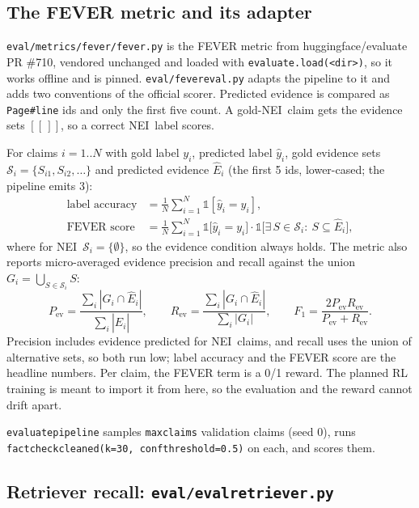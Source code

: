 \documentclass[11pt,a4paper]{article}
\makeatletter
\DeclareRobustCommand{\_}{\ifmmode\nfss@text{\textunderscore}\else\textunderscore\allowbreak\fi}
\newcommand{\file}[1]{\texttt{#1}}
\newcommand{\NEI}{\textup{NEI}}
\makeatother
\begin{document}
\subsection{The FEVER metric and its adapter}

\file{eval/metrics/fever/fever.py} is the FEVER metric from huggingface/evaluate PR \#710, vendored unchanged and
loaded with \texttt{evaluate.load(<dir>)}, so it works offline and is pinned. \file{eval/fever\_eval.py} adapts the
pipeline to it and adds two conventions of the official scorer. Predicted evidence is compared as
\texttt{Page\#line} ids and only the first five count. A gold-\NEI\ claim gets the evidence sets $[[\,]]$, so a correct
\NEI\ label scores.

For claims $i=1..N$ with gold label $y_i$, predicted label $\hat y_i$, gold evidence sets
$\mathcal{S}_i=\{S_{i1},S_{i2},\ldots\}$ and predicted evidence $\hat E_i$ (the first 5 ids, lower-cased; the
pipeline emits 3):
\begin{align*}
  \text{label accuracy} &= \frac1N\sum_{i=1}^N \mathbb{1}[\hat y_i = y_i],\\
  \text{FEVER score} &= \frac1N\sum_{i=1}^N \mathbb{1}\big[\hat y_i = y_i\big]\cdot
                         \mathbb{1}\big[\exists\,S\in\mathcal{S}_i:\ S\subseteq \hat E_i\big],
\end{align*}
where for \NEI\ $\mathcal{S}_i=\{\emptyset\}$, so the evidence condition always holds. The metric also reports
micro-averaged evidence precision and recall against the union $G_i=\bigcup_{S\in\mathcal{S}_i}S$:
\[
  P_\text{ev}=\frac{\sum_i|G_i\cap\hat E_i|}{\sum_i|\hat E_i|},\qquad
  R_\text{ev}=\frac{\sum_i|G_i\cap\hat E_i|}{\sum_i|G_i|},\qquad
  F_1=\frac{2P_\text{ev}R_\text{ev}}{P_\text{ev}+R_\text{ev}} .
\]
Precision includes evidence predicted for \NEI\ claims, and recall uses the union of alternative sets, so both run
low; label accuracy and the FEVER score are the headline numbers. Per claim, the FEVER term is a 0/1 reward. The
planned RL training is meant to import it from here, so the evaluation and the reward cannot drift apart.

\texttt{evaluate\_pipeline} samples \texttt{max\_claims} validation claims (seed 0), runs
\texttt{fact\_check\_cleaned(k=30, conf\_threshold=0.5)} on each, and scores them.

\subsection{Retriever recall: \file{eval/eval\_retriever.py}}
\end{document}
